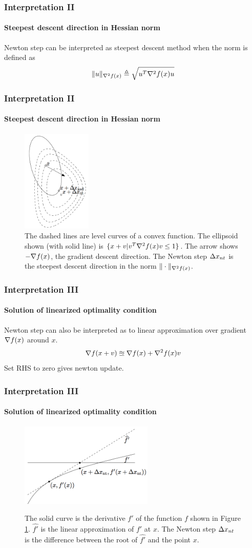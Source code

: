 \documentclass{beamer}
\newcommand{\be}{\begin{eqnarray}}
\newcommand{\ee}{\end{eqnarray}}
\begin{document}
\begin{frame}
\frametitle{Interpretation II}
\framesubtitle{Steepest descent direction in Hessian norm}
    Newton step can be interpreted as 
    steepest descent method when the norm is defined as
    \be
    \| u \|_{\fhess} \triangleq \sqrt{u^T \fhess u}
    \ee
\end{frame}

\begin{frame}
\frametitle{Interpretation II}
\framesubtitle{Steepest descent direction in Hessian norm}
\begin{figure}
\includegraphics[width=1.3in]{figure/steepest.png}
\caption{
The dashed lines are level curves of a convex function. The ellipsoid shown
(with solid line) is $\{x + v | v^T \nabla^2 f(x) v \leq 1\}$. The arrow shows
$-\nabla f(x)$, the gradient descent direction. The Newton step $\Delta x_{nt}$ is the
steepest descent direction in the norm $\|\cdot \|_{\nabla^2 f(x)}$.
}
\label{fig:2}
\end{figure}
\end{frame}

\begin{frame}
\frametitle{Interpretation III}
\framesubtitle{Solution of linearized optimality condition}
    Newton step can also be interpreted as 
    to linear approximation over gradient $\nabla f(x)$ around $x$.
    \be
        \nabla f(x+v) \approxeq \fgrad + \fhess v
    \ee
    Set RHS to zero gives newton update.
\end{frame}

\begin{frame}
\frametitle{Interpretation III}
\framesubtitle{Solution of linearized optimality condition}
\begin{figure}
\includegraphics[width=2.5in]{figure/linear.png}
\label{fig:3}
\caption{
The solid curve is the derivative $f'$ of the function $f$ shown in Figure
\ref{fig:2}.
$\hat{f'}$ is the linear approximation of $f'$ at $x$. The Newton step
$\Delta x_{nt}$ is the difference between the root of $\hat{f'}$ and the point $x$.
}
\end{figure}
\end{frame}
\end{document}
